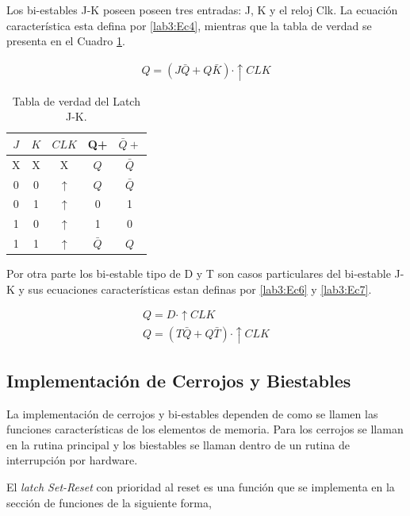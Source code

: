 Los bi-estables J-K poseen poseen tres entradas: J, K y el reloj Clk. La ecuación característica esta defina por \eqref{lab3:Ec4}, mientras que la tabla de verdad se presenta en el Cuadro \ref{tab:JK}. 

\begin{eqnarray}
	\label{lab3:Ec4}
	Q=(J\bar{Q}+Q\bar{K})\cdot\uparrow CLK
\end{eqnarray}


\begin{table}
	\centering
	\caption{Tabla de verdad del Latch J-K.}
	\label{tab:JK}
	\begin{tabular}{|c|c|c|c|c|}
		
		\hline 
		$J$ 	& $K$  & $CLK$  &  Q+ &$\bar{Q}+$ \\
		\hline 
		X	& X &	X	&	$Q$	&  $\bar{Q}$	\\ 
		0	& 0 &	$\uparrow$	&	$Q$	&  $\bar{Q}$	\\ 
		0	& 1&	$\uparrow$	&	0  &   1	  \\ 
		1	& 0 &   $\uparrow$	&	1  &   0	\\ 	
		1	& 1 &	$\uparrow$	&	$\bar{Q}$   &  $Q$	 \\ 	
		\hline 
	\end{tabular} 
\end{table} 

Por otra parte los bi-estable tipo de D y T son casos particulares del bi-estable J-K y sus ecuaciones características estan definas por \eqref{lab3:Ec6} y \eqref{lab3:Ec7}. 

\begin{eqnarray}
\label{lab3:Ec6}
Q=D\cdot\uparrow CLK \\ \label{lab3:Ec7}
Q=(T\bar{Q}+Q\bar{T})\cdot\uparrow CLK
\end{eqnarray}


\subsection{Implementación de Cerrojos y Biestables}

La implementación de cerrojos y bi-estables dependen de como se llamen las funciones características de los elementos de memoria. Para los cerrojos se llaman en la rutina principal y los biestables se llaman dentro de un rutina de interrupción por hardware.

El \textit{latch Set-Reset} con prioridad al reset es una función que se implementa en la sección de funciones de la siguiente forma,


